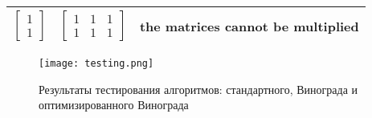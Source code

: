 \begin{table}[]
\begin{tabular}{|c|c|c|}
                $\begin{bmatrix} 1 \\ 1 \end{bmatrix}$                   & $\begin{bmatrix} 1 & 1 & 1 \\ 1 & 1 & 1 \end{bmatrix}$ & the matrices cannot be multiplied                       \\ \hline
                \end{tabular}
            \label{table:testing}
        \end{table}
        
        \begin{figure}[h!]
            \centering
            \texttt{[image: testing.png]}
            \caption{Результаты тестирования алгоритмов: стандартного, Винограда и оптимизированного Винограда}
            \label{png:testing:result}
        \end{figure}

\newpage